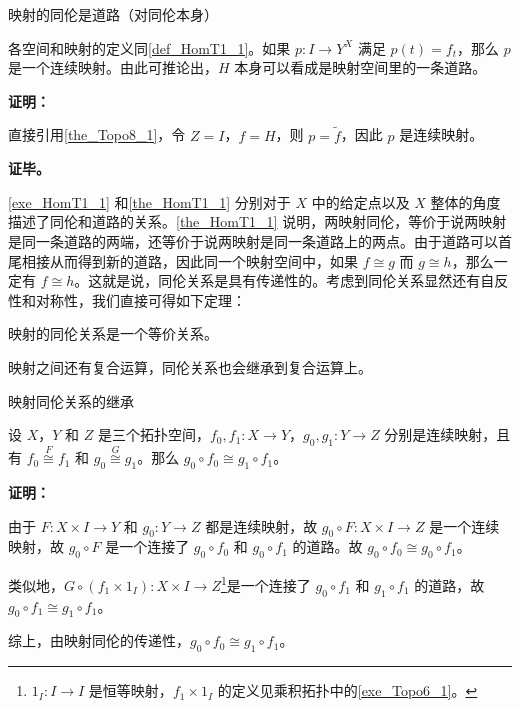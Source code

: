 \begin{theorem}{映射的同伦是道路（对同伦本身）}\label{the_HomT1_1}

各空间和映射的定义同\autoref{def_HomT1_1}。如果 $p:I\rightarrow Y^X$ 满足 $p(t)=f_t$，那么 $p$ 是一个连续映射。由此可推论出，$H$ 本身可以看成是映射空间里的一条道路。

\end{theorem}

\textbf{证明：}

直接引用\autoref{the_Topo8_1}，令 $Z=I$，$f=H$，则 $p=\widetilde{f}$，因此 $p$ 是连续映射。

\textbf{证毕。}

\autoref{exe_HomT1_1} 和\autoref{the_HomT1_1} 分别对于 $X$ 中的给定点以及 $X$ 整体的角度描述了同伦和道路的关系。\autoref{the_HomT1_1} 说明，两映射同伦，等价于说两映射是同一条道路的两端，还等价于说两映射是同一条道路上的两点。由于道路可以首尾相接从而得到新的道路，因此同一个映射空间中，如果 $f\cong g$ 而 $g\cong h$，那么一定有 $f\cong h$。这就是说，同伦关系是具有传递性的。考虑到同伦关系显然还有自反性和对称性，我们直接可得如下定理：

\begin{theorem}{}
映射的同伦关系是一个等价关系。
\end{theorem}

映射之间还有复合运算，同伦关系也会继承到复合运算上。

\begin{theorem}{映射同伦关系的继承}\label{the_HomT1_2}

设 $X$，$Y$ 和 $Z$ 是三个拓扑空间，$f_0, f_1:X\rightarrow Y$，$g_0, g_1:Y\rightarrow Z$ 分别是连续映射，且有 $f_0\overset{F}{\cong}f_1$ 和 $g_0\overset{G}{\cong}g_1$。那么 $g_0\circ f_0\cong g_1\circ f_1$。

\end{theorem}

\textbf{证明：}

由于 $F:X\times I\rightarrow Y$ 和 $g_0:Y\rightarrow Z$ 都是连续映射，故 $g_0\circ F:X\times I\rightarrow Z$ 是一个连续映射，故 $g_0\circ F$ 是一个连接了 $g_0\circ f_0$ 和 $g_0\circ f_1$ 的道路。故 $g_0\circ f_0\cong g_0\circ f_1$。

类似地，$G \circ (f_1 \times 1_I): X \times I \rightarrow Z$\footnote{$1_I:I\rightarrow I$ 是恒等映射，$f_1 \times 1_I$ 的定义见乘积拓扑中的\autoref{exe_Topo6_1}。}是一个连接了 $g_0 \circ f_1$ 和 $g_1\circ f_1$ 的道路，故 $g_0 \circ f_1\cong g_1 \circ f_1$。

综上，由映射同伦的传递性，$g_0 \circ f_0\cong g_1 \circ f_1$。

